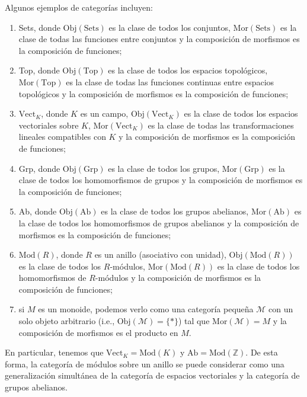 \documentclass[tesis]{subfiles}
\begin{document}
\begin{Ejem}\label{Ejem: Categorías}

    Algunos ejemplos de categorías incluyen:

    \begin{enumerate}[label=(\arabic*)]
    
        \item Sets, donde $\text{Obj}(\text{Sets})$ es la clase de todos los conjuntos, $\text{Mor}(\text{Sets})$ es la clase de todas las funciones entre conjuntos y la composición de morfismos es la composición de funciones;

        \item Top, donde $\text{Obj}(\text{Top})$ es la clase de todos los espacios topológicos, $\text{Mor}(\text{Top})$ es la clase de todas las funciones continuas entre espacios topológicos y la composición de morfismos es la composición de funciones;

        \item $\text{Vect}_K$, donde $K$ es un campo, $\text{Obj}(\text{Vect}_K)$ es la clase de todos los espacios vectoriales sobre $K$, $\text{Mor}(\text{Vect}_K)$ es la clase de todas las transformaciones lineales compatibles con $K$ y la composición de morfismos es la composición de funciones;

        \item Grp, donde $\text{Obj}(\text{Grp})$ es la clase de todos los grupos, $\text{Mor}(\text{Grp})$ es la clase de todos los homomorfismos de grupos y la composición de morfismos es la composición de funciones;

        \item Ab, donde $\text{Obj}(\text{Ab})$ es la clase de todos los grupos abelianos, $\text{Mor}(\text{Ab})$ es la clase de todos los homomorfismos de grupos abelianos y la composición de morfismos es la composición de funciones;

        \item $\text{Mod}(R)$, donde $R$ es un anillo (asociativo con unidad), $\text{Obj}(\text{Mod}(R))$ es la clase de todos los $R$-módulos, $\text{Mor}(\text{Mod}(R))$ es la clase de todos los homomorfismos de $R$-módulos y la composición de morfismos es la composición de funciones;

        \item si $M$ es un monoide, podemos verlo como una categoría pequeña $\mathscr{M}$ con un solo objeto arbitrario (i.e., $\text{Obj}(\mathscr{M})=\{\ast\}$) tal que $\text{Mor}(\mathscr{M})=M$ y la composición de morfismos es el producto en $M$.
    \end{enumerate}

    \noindent En particular, tenemos que $\text{Vect}_K = \text{Mod}(K)$ y $\text{Ab} = \text{Mod}(\mathbb{Z})$. De esta forma, la categoría de módulos sobre un anillo se puede considerar como una generalización simultánea de la categoría de espacios vectoriales y la categoría de grupos abelianos.
\end{Ejem}
\end{document}
